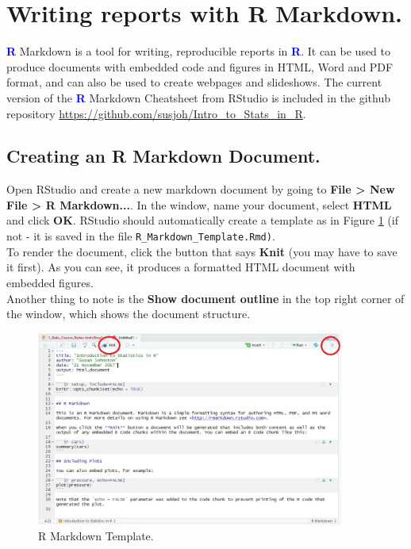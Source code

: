\documentclass[a4paper,12pt]{article}
\newcommand\boldblue[1]{\textcolor{blue}{\textbf{#1}}}
\begin{document}
\section {Writing reports with R Markdown.}


\boldblue{R} Markdown is a tool for writing, reproducible reports in \boldblue{R}. It can be used to produce documents with embedded code and figures in HTML, Word and PDF format, and can also be used to create webpages and slideshows. The current version of the \boldblue{R} Markdown Cheatsheet from RStudio is included in the github repository \url{https://github.com/susjoh/Intro_to_Stats_in_R}.

\subsection{Creating an R Markdown Document.}

Open RStudio and create a new markdown document by going to \textbf{File > New File > R Markdown...}. In the window, name your document, select \textbf{HTML} and click \textbf{OK}. RStudio should automatically create a template as in Figure \ref{fig:MarkdownTemplate} (if not - it is saved in the file \texttt{R\_Markdown\_Template.Rmd)}. \\

To render the document, click the button that says \textbf{Knit} (you may have to save it first). As you can see, it produces a formatted HTML document with embedded figures. \\

Another thing to note is the \textbf{Show document outline} in the top right corner of the window, which shows the document structure.

\begin{figure}[h]
	\centering 
	\includegraphics[width=0.9\textwidth]{figs/MarkdownTemplate.JPG}
	\caption{R Markdown Template.}
	\label{fig:MarkdownTemplate}
\end{figure} 
\end{document}
